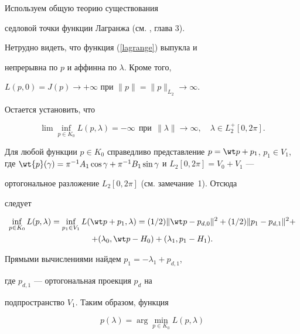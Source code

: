 \begin{pf}


Используем общую теорию существования


седловой точки функции Лагранжа (см. \cite{Ekland}, глава 3).


Нетрудно видеть, что функция (\ref{lagrange}) выпукла и


непрерывна по $p$ и аффинна по $\lambda$. Кроме того,


$L(p,0)=J(p)\to +\infty$ при $\|


p\|=\| p\|_{L_{2}}\to \infty$.


Остается установить, что


$$


\lim \inf _{p \in K_{0}}L(p,\lambda)=-\infty \ \ \text{при}


\ \ \|\lambda\|\to\infty, \quad \lambda \in


L^{+}_{2}[0,2\pi].


$$





Для любой функции $p\in K_{0}$ справедливо представление $p=\wt


p+p_1$, $p_1\in V_1$, где $\wt{p}(\gamma)=\pi^{-1}A_{1}\cos


\gamma +\pi^{-1}B_{1}\sin \gamma$ и $L_2 [0, 2\pi]=V_0+V_1$ ---


ортогональное разложение $L_2 [0, 2\pi]$ (см. замечание~1). Отсюда


следует


\begin{gather*}


\inf_{p\in K_{0}} L(p,\lambda)=\inf_{p_{1}\in V_1}


L(\wt p+p_{1},\lambda)=(1/2)\| \wt


p-p_{d,0}\|^2+(1/2)\| p_1-p_{d,1}\|^2+ \\


+(\lambda_0, \wt p - H_0)+ (\lambda_1, p_1-H_1).


\end{gather*}


Прямыми вычислениями найдем $p_{1}=-\lambda_{1}+p_{d,1}$,


где $p_{d,1}$ --- ортогональная проекция $p_d$ на


подпространство $V_1$. Таким образом, функция


\begin{equation}\label {p}


p(\lambda)=\arg \min_{p\in K_{0}} L(p,\lambda)



\end{equation}
\end{pf}
